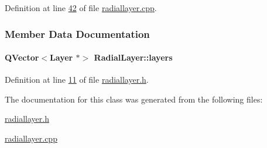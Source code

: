 Definition at line \hyperlink{radiallayer_8cpp_source_l00042}{42} of file \hyperlink{radiallayer_8cpp_source}{radiallayer.\+cpp}.



\subsubsection{Member Data Documentation}
\hypertarget{class_radial_layer_a714c36b1ab50a7778953e924ddac2787}{}
\paragraph[{layers}]{\setlength{\rightskip}{0pt plus 5cm}Q\+Vector$<${\bf Layer} $\ast$$>$ Radial\+Layer\+::layers}\label{class_radial_layer_a714c36b1ab50a7778953e924ddac2787}


Definition at line \hyperlink{radiallayer_8h_source_l00011}{11} of file \hyperlink{radiallayer_8h_source}{radiallayer.\+h}.



The documentation for this class was generated from the following files\+:\begin{DoxyCompactItemize}
\item 
\hyperlink{radiallayer_8h}{radiallayer.\+h}\item 
\hyperlink{radiallayer_8cpp}{radiallayer.\+cpp}\end{DoxyCompactItemize}
